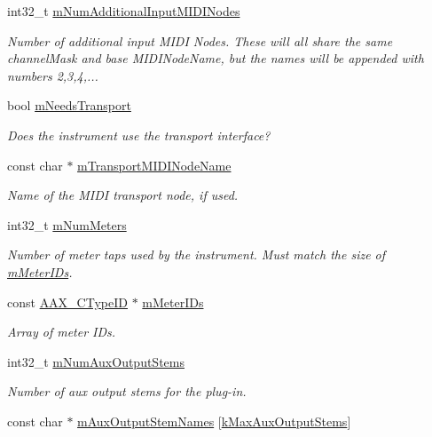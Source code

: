 \begin{DoxyCompactItemize}
int32\+\_\+t \hyperlink{a00124_a256b7a612ed6ff827d47d8ea5b7c0968}{m\+Num\+Additional\+Input\+M\+I\+D\+I\+Nodes}
\begin{DoxyCompactList}\small\item\em Number of additional input M\+I\+D\+I Nodes. These will all share the same channel\+Mask and base M\+I\+D\+I\+Node\+Name, but the names will be appended with numbers 2,3,4,... \end{DoxyCompactList}\item 
bool \hyperlink{a00124_af76fbb79466b45d7f48153e7951e843a}{m\+Needs\+Transport}
\begin{DoxyCompactList}\small\item\em Does the instrument use the transport interface? \end{DoxyCompactList}\item 
const char $\ast$ \hyperlink{a00124_a8e96dc4ba78132184cfff16720e72bde}{m\+Transport\+M\+I\+D\+I\+Node\+Name}
\begin{DoxyCompactList}\small\item\em Name of the M\+I\+D\+I transport node, if used. \end{DoxyCompactList}\item 
int32\+\_\+t \hyperlink{a00124_a58815894e89a352e5013046cbfa2a834}{m\+Num\+Meters}
\begin{DoxyCompactList}\small\item\em Number of meter taps used by the instrument. Must match the size of \hyperlink{a00124_a996dacfece0048579de34e08cb10b449}{m\+Meter\+I\+Ds}. \end{DoxyCompactList}\item 
const \hyperlink{a00149_ac678f9c1fbcc26315d209f71a147a175}{A\+A\+X\+\_\+\+C\+Type\+I\+D} $\ast$ \hyperlink{a00124_a996dacfece0048579de34e08cb10b449}{m\+Meter\+I\+Ds}
\begin{DoxyCompactList}\small\item\em Array of meter I\+Ds. \end{DoxyCompactList}\item 
int32\+\_\+t \hyperlink{a00124_ac969f7d3a23a8bb66d53c8e6d8360dca}{m\+Num\+Aux\+Output\+Stems}
\begin{DoxyCompactList}\small\item\em Number of aux output stems for the plug-\/in. \end{DoxyCompactList}\item 
const char $\ast$ \hyperlink{a00124_a407f17bca3271cc84f0b85eefb0370cd}{m\+Aux\+Output\+Stem\+Names} \mbox{[}\hyperlink{a00178_a3ce9db1fba97512379a8715f9cb166e4}{k\+Max\+Aux\+Output\+Stems}\mbox{]}

\end{DoxyCompactItemize}
